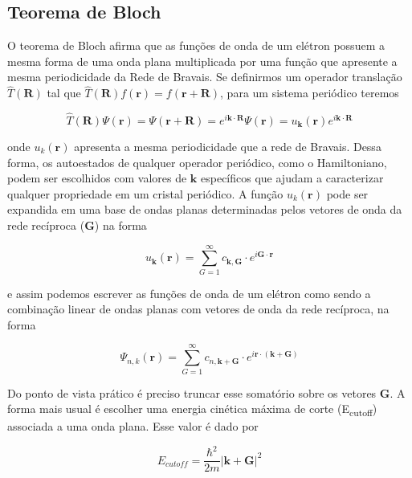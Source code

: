 	\subsection{Teorema de Bloch}
	
		O teorema de Bloch afirma que as funções de onda de um elétron possuem a mesma forma de uma onda plana multiplicada por uma função que apresente a mesma periodicidade da Rede de Bravais.  Se definirmos um operador translação $\hat{T}(\mathbf{R})$ tal que $\hat{T}(\mathbf{R})f(\mathbf{r}) = f(\mathbf{r} + \mathbf{R})$, para um sistema periódico teremos
		
		\begin{equation}
			\hat{T}(\mathbf{R})\Psi(\mathbf{r}) = \Psi(\mathbf{r} + \mathbf{R}) = e^{i\mathbf{k}\cdot\mathbf{R}}\Psi(\mathbf{r}) = u_\mathbf{k}(\mathbf{r})e^{i\mathbf{k}\cdot\mathbf{R}}
		\end{equation}
		
		onde $u_k(\mathbf{r})$ apresenta a mesma periodicidade que a rede de Bravais. Dessa forma, os autoestados de qualquer operador periódico, como o Hamiltoniano, podem ser escolhidos com valores de $\mathbf{k}$ específicos que ajudam a caracterizar qualquer propriedade em um cristal periódico. 
		A função $u_k(\mathbf{r})$ pode ser expandida em uma base de ondas planas determinadas pelos vetores de onda da rede recíproca ($\mathbf{G}$) na forma
		
		\begin{equation}
			u_\mathbf{k}(\mathbf{r}) = \sum_{G=1}^{\infty} c_{\mathbf{k},\mathbf{G}}\cdot e^{i\mathbf{G}\cdot \mathbf{r}}
		\end{equation}
		
		e assim podemos escrever as funções de onda de um elétron como sendo a combinação linear de ondas planas com vetores de onda da rede recíproca, na forma
		
		\begin{equation}
		\Psi_{n,k}(\mathbf{r}) = \sum_{G=1}^{\infty} c_{n,\mathbf{k} + \mathbf{G}}\cdot e^{i\mathbf{r}\cdot (\mathbf{k} + \mathbf{G})}
		\end{equation}
		
		Do ponto de vista prático é preciso truncar esse somatório sobre os vetores $\mathbf{G}$. A forma mais usual é escolher uma energia cinética máxima de corte (E\textsubscript{cutoff}) associada a uma onda plana. Esse valor é dado por
		
		\begin{equation}
			E_{cutoff} = \frac{\hbar^2}{2m}|\mathbf{k} + \mathbf{G}|^2
		\end{equation}
		
